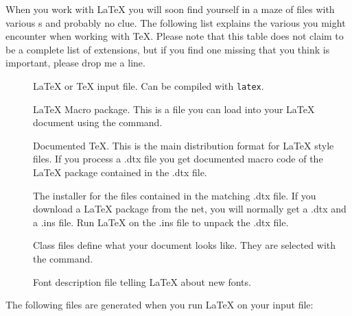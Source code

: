 When you work with \LaTeX{} you will soon find yourself in a maze of
files with various s and probably no clue. The following
list explains the various  you might encounter when
working with \TeX{}. Please note that this table does not claim to be
a complete list of extensions, but if you find one missing that you
think is important, please drop me a line.

\begin{description}
  
\item[] \LaTeX{} or \TeX{} input file. Can be compiled with
  \texttt{latex}.
\item[] \LaTeX{} Macro package. This is a file you can load
  into your \LaTeX{} document using the  command.
\item[] Documented \TeX{}. This is the main distribution
  format for \LaTeX{} style files. If you process a .dtx file you get
  documented macro code of the \LaTeX{} package contained in the .dtx
  file.
\item[] The installer for the files contained in the
  matching .dtx file. If you download a \LaTeX{} package from the net,
  you will normally get a .dtx and a .ins file. Run \LaTeX{} on the
  .ins file to unpack the .dtx file.
\item[] Class files define what your document looks
  like. They are selected with the  command.
\item[] Font description file telling  \LaTeX{} about new fonts.
\end{description}
The following files are generated when you run \LaTeX{} on your input
file:

